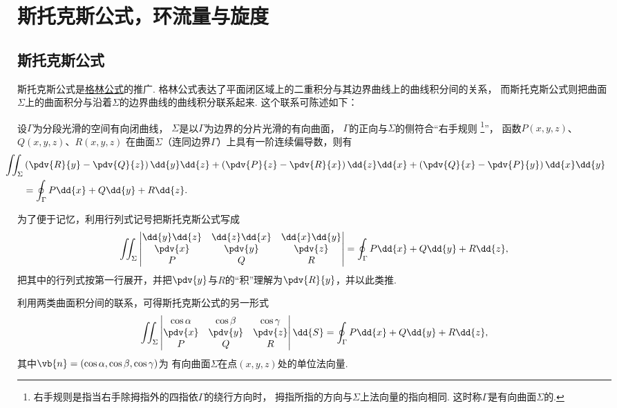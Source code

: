 \section{斯托克斯公式，环流量与旋度}
\subsection{斯托克斯公式}
斯托克斯公式是\hyperref[equation:线积分与面积分.格林公式]{格林公式}的推广.
格林公式表达了平面闭区域上的二重积分与其边界曲线上的曲线积分间的关系，
而斯托克斯公式则把曲面\(\Sigma\)上的曲面积分与沿着\(\Sigma\)的边界曲线的曲线积分联系起来.
这个联系可陈述如下：

\begin{theorem}[斯托克斯公式]
设\(\Gamma\)为分段光滑的空间有向闭曲线，
\(\Sigma\)是以\(\Gamma\)为边界的分片光滑的有向曲面，
\(\Gamma\)的正向与\(\Sigma\)的侧符合“右手规则%
\footnote{右手规则是指当右手除拇指外的四指依\(\Gamma\)的绕行方向时，
拇指所指的方向与\(\Sigma\)上法向量的指向相同.
这时称\(\Gamma\)是有向曲面\(\Sigma\)的.}”，
函数\(P(x,y,z)\)、\(Q(x,y,z)\)、\(R(x,y,z)\)
在曲面\(\Sigma\)（连同边界\(\Gamma\)）上具有一阶连续偏导数，则有
\begin{equation}\label{equation:线积分与面积分.斯托克斯公式}
	\begin{split}
		&\hspace{-20pt}\iint_\Sigma
			\left( \pdv{R}{y} - \pdv{Q}{z} \right)\dd{y}\dd{z}
			+\left( \pdv{P}{z} - \pdv{R}{x} \right)\dd{z}\dd{x}
			+\left( \pdv{Q}{x} - \pdv{P}{y} \right)\dd{x}\dd{y} \\
		&= \oint_\Gamma P\dd{x}+Q\dd{y}+R\dd{z}.
	\end{split}
\end{equation}
\end{theorem}

为了便于记忆，利用行列式记号把斯托克斯公式写成\[
	\iint_\Sigma \begin{vmatrix}
		\dd{y}\dd{z} & \dd{z}\dd{x} & \dd{x}\dd{y} \\
		\pdv{x} & \pdv{y} & \pdv{z} \\
		P & Q & R
	\end{vmatrix}
	= \oint_\Gamma P\dd{x}+Q\dd{y}+R\dd{z},
\]
把其中的行列式按第一行展开，并把\(\pdv{y}\)与\(R\)的“积”理解为\(\pdv{R}{y}\)，并以此类推.

利用两类曲面积分间的联系，可得斯托克斯公式的另一形式\[
	\iint_\Sigma \begin{vmatrix}
		\cos\alpha & \cos\beta & \cos\gamma \\
		\pdv{x} & \pdv{y} & \pdv{z} \\
		P & Q & R
	\end{vmatrix} \dd{S}
	= \oint_\Gamma P\dd{x}+Q\dd{y}+R\dd{z},
\]
其中\(\vb{n}=(\cos\alpha,\cos\beta,\cos\gamma)\)为
有向曲面\(\Sigma\)在点\((x,y,z)\)处的单位法向量.

